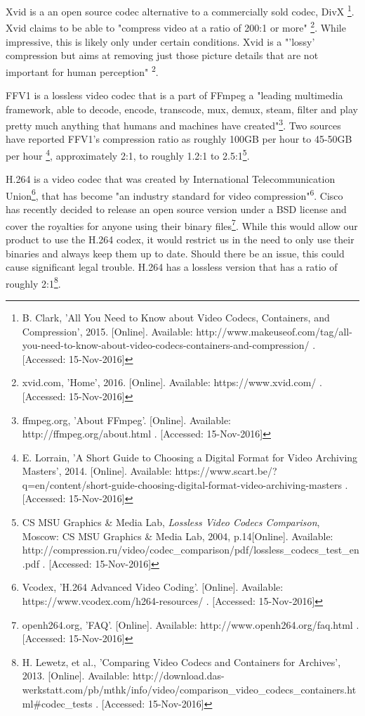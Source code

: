 \documentclass[letterpaper,10pt,onecolumn,draftclsnofoot]{IEEEtran}
\begin{document}
Xvid is a an open source codec alternative to a commercially sold codec, DivX \footnote{B. Clark, 'All You Need to Know about Video Codecs, Containers, and Compression', 2015. [Online]. Available: http://www.makeuseof.com/tag/all-you-need-to-know-about-video-codecs-containers-and-compression/ . [Accessed: 15-Nov-2016] }. %
Xvid claims to be able to "compress video at a ratio of 200:1 or more" \footnote{xvid.com, 'Home', 2016. [Online]. Available: https://www.xvid.com/ . [Accessed: 15-Nov-2016] }. %
While impressive, this is likely only under certain conditions.
Xvid is a "'lossy' compression but aims at removing just those picture details that are not important for human perception" \textsuperscript{2}. %

FFV1 is a lossless video codec that is a part of FFmpeg a "leading multimedia framework, able to decode, encode, transcode, mux, demux, steam, filter and play pretty much anything that humans and machines have created"\footnote{ffmpeg.org, 'About FFmpeg'. [Online]. Available: http://ffmpeg.org/about.html . [Accessed: 15-Nov-2016] }. %
Two sources have reported FFV1's compression ratio as roughly 100GB per hour to 45-50GB per hour \footnote{E. Lorrain, 'A Short Guide to Choosing a Digital Format for Video Archiving Masters', 2014. [Online]. Available: https://www.scart.be/?q=en/content/short-guide-choosing-digital-format-video-archiving-masters . [Accessed: 15-Nov-2016] }, approximately 2:1, to roughly 1.2:1 to 2.5:1\footnote{CS MSU Graphics \& Media Lab, \textit{Lossless Video Codecs Comparison}, Moscow: CS MSU Graphics \& Media Lab, 2004, p.14[Online]. Available: http://compression.ru/video/codec\_comparison/pdf/lossless\_codecs\_test\_en.pdf . [Accessed: 15-Nov-2016] }. %

H.264 is a video codec that was created by International Telecommunication Union\footnote{Vcodex, 'H.264 Advanced Video Coding'. [Online]. Available: https://www.vcodex.com/h264-resources/ . [Accessed: 15-Nov-2016] }, that has become "an industry standard for video compression"\textsuperscript{6}. %
Cisco has recently decided to release an open source version under a BSD license and cover the royalties for anyone using their binary files\footnote{openh264.org, 'FAQ'. [Online]. Available: http://www.openh264.org/faq.html . [Accessed: 15-Nov-2016] }. %
While this would allow our product to use the H.264 codex, it would restrict us in the need to only use their binaries and always keep them up to date.
Should there be an issue, this could cause significant legal trouble.
H.264 has a lossless version that has a ratio of roughly 2:1\footnote{H. Lewetz, et al., 'Comparing Video Codecs and Containers for Archives', 2013. [Online]. Available: http://download.das-werkstatt.com/pb/mthk/info/video/comparison\_video\_codecs\_containers.html\#codec\_tests . [Accessed: 15-Nov-2016] }. %
\end{document}
